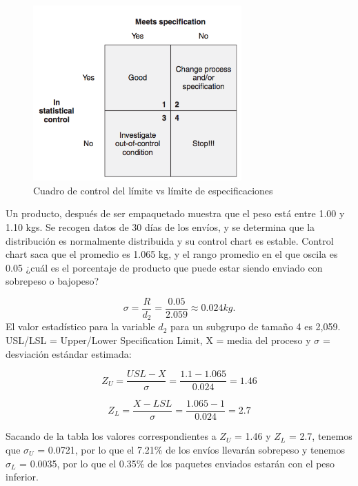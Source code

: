 \documentclass[oneside]{book}
\begin{document}
\begin{figure}[H]
	\centering
	\includegraphics[width=80mm]{imagenes/Controllimitversusspecificationlimitgrid.png}
	\caption{Cuadro de control del límite vs límite de especificaciones}
	\label{fig:Controllimitversusspecificationlimitgrid}
\end{figure}

Un producto, después de ser empaquetado muestra que el peso está entre 1.00 y 1.10 kgs. Se recogen datos de 30 días de los envíos, y se determina que la distribución es normalmente distribuida y su control chart es estable. Control chart saca que el promedio es 1.065 kg, y el rango promedio en el que oscila es 0.05 ¿cuál es el porcentaje de producto que puede estar siendo enviado con sobrepeso o bajopeso?

\begin{equation}
\sigma = \frac{R}{d_2} = \frac{0.05}{2.059} \approx 0.024 kg.
\end{equation}
El valor estadístico para la variable $d_2$ para un subgrupo de tamaño 4 es 2,059. USL/LSL = Upper/Lower Specification Limit, X = media del proceso y $\sigma$ = desviación estándar estimada:

\begin{equation}
Z_U = \frac{USL - X}{\sigma} = \frac{1.1 - 1.065}{0.024} = 1.46
\end{equation}

\begin{equation}
Z_L = \frac{X - LSL}{\sigma} = \frac{1.065 - 1}{0.024} = 2.7
\end{equation}

Sacando de la tabla los valores correspondientes a $Z_U$ = 1.46 y $Z_L$ = 2.7, tenemos que $\sigma_U$ = 0.0721, por lo que el 7.21\% de los envíos llevarán sobrepeso y tenemos $\sigma_L$ = 0.0035, por lo que el 0.35\% de los paquetes enviados estarán con el peso inferior.
\end{document}
